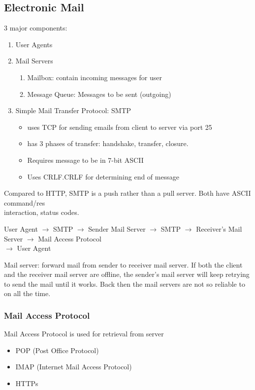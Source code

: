 \documentclass[a4paper]{article}
\begin{document}
\subsection{Electronic Mail}
3 major components:
\begin{enumerate}
    \item User Agents
    \item Mail Servers
    \begin{enumerate}[label=\roman*.]
        \item Mailbox: contain incoming messages for user
        \item Message Queue: Messages to be sent (outgoing) 
    \end{enumerate}
    \item Simple Mail Transfer Protocol: SMTP
    \begin{itemize}[label=$\circ$]
        \item uses TCP for sending emails from client to server via port 25
        \item has 3 phases of transfer: handshake, transfer, closure.
        \item Requires message to be in 7-bit ASCII
        \item Uses CRLF.CRLF for determining end of message
    \end{itemize}
\end{enumerate}

\noindent Compared to HTTP, SMTP is a push rather than a pull server. Both have ASCII command/res\\ interaction, status codes.

\medskip

\noindent User Agent $\rightarrow$ SMTP $\rightarrow$ Sender Mail Server $\rightarrow$ SMTP $\rightarrow$ Receiver's Mail Server $\rightarrow$ Mail Access Protocol \\$\rightarrow$ User Agent

\medskip

\noindent Mail server: forward mail from sender to receiver mail server. If both the client and the receiver mail server are offline, the sender's mail server will keep retrying to send the mail until it works. Back then the mail servers are not so reliable to on all the time.

\subsubsection{Mail Access Protocol}
Mail Access Protocol is used for retrieval from server
\begin{itemize}
    \item POP (Post Office Protocol)
    \item IMAP (Internet Mail Access Protocol)
    \item HTTPs
\end{itemize}
\end{document}
